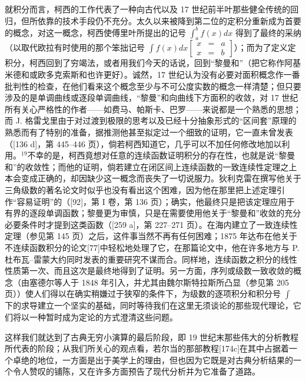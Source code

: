 就积分而言，柯西的工作代表了一种向古代以及 17 世纪前半叶那些健全传统的回归，但所依靠的技术手段仍不充分。太久以来被降到第二位的定积分重新成为首要的概念，对这一概念，柯西使傅里叶所提出的记号 \(\int_{a}^{b} f(x) dx\) 得到了最终的采纳（以取代欧拉有时使用的那个笨拙记号 \(\int f(x) dx\left[\begin{array}{ccc}x & = & a \\ x & = & b\end{array}\right]\)）；而为了定义定积分，柯西回到了穷竭法，或者用我们今天的话说，回到“黎曼和”（把它称作阿基米德和或欧多克索斯和也许更好）。诚然，17 世纪认为没有必要对面积概念作一番批判性的检查，在他们看来这个概念至少与不可公度实数的概念一样清楚；但只要涉及的是单调曲线或逐段单调曲线，“黎曼”和向曲线下方面积的收敛，对 17 世纪所有关心严格性的作者——如费马、帕斯卡、巴罗——来说都是一个熟悉的思想；而 J. 格雷戈里由于对过渡到极限的思考以及已经十分抽象形式的“区间套”原理的熟悉而有了特别的准备，据推测他甚至拟定过一个细致的证明，它一直未曾发表（{[}136 d{]}，第 445–446 页），倘若柯西知道它，几乎可以不加任何修改地加以利用。\(^{19}\)不幸的是，柯西竟想对任意的连续函数证明积分的存在性，也就是说“黎曼和”的收敛性；而他的证明，倘若建立在闭区间上连续函数的一致连续性定理之上本会变成正确的，却因缺少这一概念而丧失了一切说服力。狄利克雷在撰写他关于三角级数的著名论文时似乎也没有看出这个困难，因为他在那里把上述定理引作“容易证明”的（{[}92{]}，第 I 卷，第 136 页）；确实，他最终只是把该定理应用于有界的逐段单调函数；黎曼更为审慎，只是在需要使用他关于“黎曼和”收敛的充分必要条件时才提到这类函数（{[}259 a{]}，第 227–271 页）。在海内建立了一致连续性定理（参见第 145 页）之后，这件事当然不再有任何困难；1875 年达布在他关于不连续函数积分的论文{[}77{]}中轻松地处理了它，在那篇论文中，他在许多地方与 P. 杜布瓦–雷蒙大约同时发表的重要研究不谋而合。同样地，连续函数之积分的线性性质第一次、而且这次是最终地得到了证明。另一方面，序列或级数一致收敛的概念（由塞德尔等人于 1848 年引入，并尤其由魏尔斯特拉斯所凸显（参见第 205 页））使人们得以在确实稍嫌过于狭窄的条件下，为级数的逐项积分和积分号 \(\int\) 下的求导建立一个坚实的基础，同时等待我们在这里无须谈论的那些现代理论，它们将以一种暂时成为定论的方式澄清这些问题。

这样我们就达到了古典无穷小演算的最后阶段，即 19 世纪末那些伟大的分析教程所代表的阶段；从我们所关心的观点看，若尔当的那部教程{[}174c{]}在其中占据着一个卓绝的地位，一方面是出于美学上的理由，但也因为它既是对古典分析结果的一个令人赞叹的铺陈，又在许多方面预告了现代分析并为它准备了道路。

